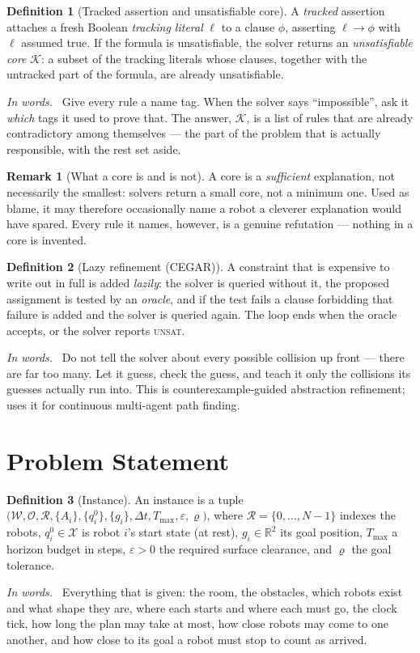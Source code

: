 \documentclass[conference]{IEEEtran}
\theoremstyle{plain}
\theoremstyle{definition}
\newtheorem{definition}{Definition}
\newtheorem{remark}{Remark}
\newcommand{\inwords}{\par\smallskip\noindent\textit{In words.}\ }
\newcommand{\R}{\mathbb{R}}
\newcommand{\W}{\mathcal{W}}
\newcommand{\Obs}{\mathcal{O}}
\newcommand{\Rob}{\mathcal{R}}
\newcommand{\X}{\mathcal{X}}
\newcommand{\Core}{\mathcal{K}}
\newcommand{\clr}{\varepsilon}
\begin{document}
\begin{definition}[Tracked assertion and unsatisfiable core]
\label{def:core}
A \emph{tracked} assertion attaches a fresh Boolean \emph{tracking literal} $\ell$ to a
clause $\phi$, asserting $\ell \rightarrow \phi$ with $\ell$ assumed true. If the formula is
unsatisfiable, the solver returns an \emph{unsatisfiable core} $\Core$: a subset of the
tracking literals whose clauses, together with the untracked part of the formula, are
already unsatisfiable.
\inwords
Give every rule a name tag. When the solver says ``impossible'', ask it \emph{which} tags it
used to prove that. The answer, $\Core$, is a list of rules that are already contradictory
among themselves --- the part of the problem that is actually responsible, with the rest
set aside.
\end{definition}

\begin{remark}[What a core is and is not]
A core is a \emph{sufficient} explanation, not necessarily the smallest: solvers return a
small core, not a minimum one. Used as blame, it may therefore occasionally name a robot a
cleverer explanation would have spared. Every rule it names, however, is a genuine
refutation --- nothing in a core is invented.
\end{remark}

\begin{definition}[Lazy refinement (CEGAR)]
\label{def:cegar}
A constraint that is expensive to write out in full is added \emph{lazily}: the solver is
queried without it, the proposed assignment is tested by an \emph{oracle}, and if the test
fails a clause forbidding that failure is added and the solver is queried again. The loop
ends when the oracle accepts, or the solver reports \textsc{unsat}.
\inwords
Do not tell the solver about every possible collision up front --- there are far too many.
Let it guess, check the guess, and teach it only the collisions its guesses actually run
into. This is counterexample-guided abstraction refinement; \cite{surynek2020} uses it for
continuous multi-agent path finding.
\end{definition}

\section{Problem Statement}
\label{sec:problem}

\begin{definition}[Instance]
\label{def:instance}
An instance is a tuple
$\big(\W, \Obs, \Rob, \{A_i\}, \{q_i^{0}\}, \{g_i\}, \Delta t, T_{\max}, \clr, \varrho\big)$,
where $\Rob = \{0,\dots,N-1\}$ indexes the robots, $q_i^{0} \in \X$ is robot $i$'s start
state (at rest), $g_i \in \R^2$ its goal position, $T_{\max}$ a horizon budget in steps,
$\clr > 0$ the required surface clearance, and $\varrho$ the goal tolerance.
\inwords
Everything that is given: the room, the obstacles, which robots exist and what shape they
are, where each starts and where each must go, the clock tick, how long the plan may take at
most, how close robots may come to one another, and how close to its goal a robot must stop
to count as arrived.
\end{definition}
\end{document}
